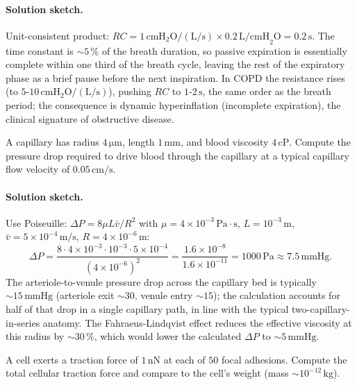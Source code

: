 \paragraph{Solution sketch.}
Unit-consistent product: $RC = 1\,\text{cmH}_2\text{O}/(\text{L/s})
\times 0.2\,\text{L/cmH}_2\text{O} = 0.2\,\text{s}$. The time constant
is $\sim 5\,\%$ of the breath duration, so passive expiration is
essentially complete within one third of the breath cycle, leaving
the rest of the expiratory phase as a brief pause before the next
inspiration. In COPD the resistance rises (to $5\text{-}10\,\text{cmH}_2\text{O}/(\text{L/s})$),
pushing $RC$ to $1\text{-}2\,\text{s}$, the same order as the breath
period; the consequence is dynamic hyperinflation (incomplete
expiration), the clinical signature of obstructive disease.

\begin{exercise}
A capillary has radius $4\,\si{\micro\meter}$, length $1\,\text{mm}$,
and blood viscosity $4\,\text{cP}$. Compute the pressure drop required
to drive blood through the capillary at a typical capillary flow
velocity of $0.05\,\text{cm}/\text{s}$.
\end{exercise}

\paragraph{Solution sketch.}
Use Poiseuille:
$\Delta P = 8 \mu L \bar v / R^2$
with $\mu = 4 \times 10^{-3}\,\text{Pa}\cdot\text{s}$,
$L = 10^{-3}\,\text{m}$, $\bar v = 5\times 10^{-4}\,\text{m/s}$,
$R = 4\times 10^{-6}\,\text{m}$:
\[
\Delta P = \frac{8 \cdot 4\times 10^{-3} \cdot 10^{-3} \cdot 5\times 10^{-4}}
                {(4\times 10^{-6})^2}
        = \frac{1.6\times 10^{-8}}{1.6\times 10^{-11}}
        = 1000\,\text{Pa} \approx 7.5\,\text{mmHg}.
\]
The arteriole-to-venule pressure drop across the capillary bed is
typically $\sim 15\,\text{mmHg}$ (arteriole exit $\sim 30$,
venule entry $\sim 15$); the calculation accounts for half of that
drop in a single capillary path, in line with the typical
two-capillary-in-series anatomy. The Fahraeus-Lindqvist effect
reduces the effective viscosity at this radius by $\sim 30\,\%$,
which would lower the calculated $\Delta P$ to $\sim 5\,\text{mmHg}$.

\begin{exercise}
A cell exerts a traction force of $1\,\text{nN}$ at each of $50$
focal adhesions. Compute the total cellular traction force and
compare to the cell's weight (mass $\sim 10^{-12}\,\text{kg}$).
\end{exercise}

